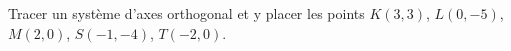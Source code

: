 
\begin{exercice}\label{exo2smath-0052}

    Tracer un système d'axes orthogonal et y placer les points \( K(3,3)\), \( L(0,-5)\), \( M(2,0)\), \( S(-1,-4)\), \( T(-2,0)\).

\end{exercice}
